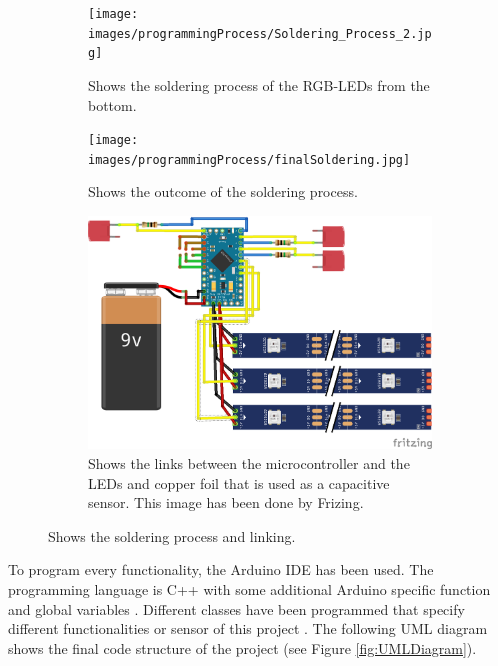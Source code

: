 \documentclass[04_projectProcess.tex]{subfiles}
\begin{document}
\begin{flushleft}
\begin{figure}[H]
\begin{subfigure}{.45\textwidth}
                \texttt{[image: images/programmingProcess/Soldering\_Process\_2.jpg]}
                \caption{Shows the soldering process of the RGB-LEDs from the bottom.}
                \label{fig:solderingProcess_2}
                \vspace{6mm}
            \end{subfigure}
            \begin{subfigure}{.45\textwidth}
                \centering
                \texttt{[image: images/programmingProcess/finalSoldering.jpg]}
                \caption{Shows the outcome of the soldering process.} 
                \label{fig:finalSoldering}
                \vspace{6mm}
            \end{subfigure}
            \begin{subfigure}{.45\textwidth}
                \centering
                \includegraphics[width=0.8\linewidth]{images/programmingProcess/sensorLinks.png}
                \caption{Shows the links between the microcontroller and the LEDs and copper foil that is 
                used as a capacitive sensor. This image has been done by Frizing. \cite{fritzing}}
                \label{fig:solderingProcess_3}
                \vspace{6mm}
            \end{subfigure}
            \caption{Shows the soldering process and linking.}
            \label{fig:solderingProcess}
        \end{figure}

        \noindent
        To program every functionality, the Arduino IDE  has been used. The programming language 
        is C++ with some additional Arduino specific function and global variables \cite{introductionArduino}. 
        Different classes have been programmed that specify different functionalities or sensor 
        of this project \cite{arduinoClasses}. The following UML diagram shows the final code 
        structure of the project (see Figure \ref{fig:UMLDiagram}).


\end{flushleft}
\end{document}
